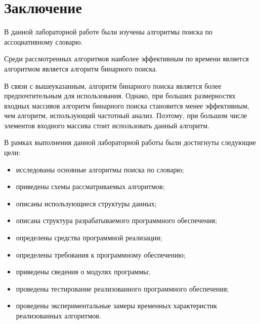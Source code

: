 \chapter*{Заключение}
В данной лабораторной работе были изучены алгоритмы поиска по ассоциативному словарю. 

Среди рассмотренных алгоритмов наиболее эффективным по времени является алгоритмом является алгоритм бинарного поиска. 

В связи с вышеуказанным, алгоритм бинарного поиска является более предпочтительным для использования. Однако, при больших размерностях входных массивов алгоритм бинарного поиска становится менее эффективным, чем алгоритм, использующий частотный анализ. Поэтому, при большом числе элементов входного массива стоит использовать данный алгоритм.

В рамках выполнения данной лабораторной работы были достигнуты следующие цели:
\begin{itemize}
	\item исследованы основные алгоритмы поиска по словарю;
	\item приведены схемы рассматриваемых алгоритмов;
	\item описаны использующиеся структуры данных;
	\item описана структура разрабатываемого программного обеспечения;
	\item определены средства программной реализации;
	\item определены требования к программному обеспечению;
	\item приведены сведения о модулях программы;
	\item проведены тестирование реализованного программного обеспечения;
	\item проведены экспериментальные замеры временных характеристик реализованных алгоритмов.
\end{itemize}
